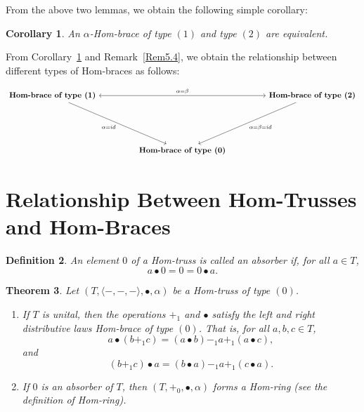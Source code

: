 \documentclass[14pt]{article}
\newtheorem{thm}{Theorem}[section]
\theoremstyle{Definition}
\newtheorem{Def}[thm]{Definition}
\newtheorem{Coro}[thm]{Corollary}
\theoremstyle{remark}
\begin{document}
From the above two lemmas, we obtain the following simple corollary:
\begin{Coro}\label{Coro5.9}
An $\alpha$-Hom-brace of type $(1)$ and type $(2)$ are equivalent.
\end{Coro}

From Corollary~\ref{Coro5.9} and Remark~\ref{Rem5.4}, we obtain the relationship between different types of Hom-braces as follows:  

\[
\begin{tikzcd}
	{\textbf{Hom-brace of type (1)}} 
	\arrow[<->, "{\alpha=\beta}"]{rrrr} 
	&&&& {\textbf{Hom-brace of type (2)}} \\
	\\
	\\
	&& {\textbf{Hom-brace of type (0)}}
	\arrow["{\alpha=id}"', from=1-1, to=4-3]
	\arrow["{\alpha=\beta=id}", from=1-5, to=4-3]
\end{tikzcd}
\]

 
 
 \section{Relationship Between Hom-Trusses and Hom-Braces}
\begin{Def}
An element $0$ of a Hom-truss is called an \emph{absorber} if, for all $a \in T$,
\[
a \bullet 0 = 0 = 0 \bullet a.
\]
\end{Def}

\begin{thm}
Let $(T,\langle-,-,-\rangle,\bullet,\alpha)$ be a Hom-truss of type $(0)$.
\begin{enumerate}
\item[(1)] If $T$ is unital, then the operations $+_{1}$ and $\bullet$ satisfy the left and right distributive laws Hom-brace of type $(0)$. That is, for all $a,b,c \in T$,
\[
a \bullet (b +_{1} c) = (a \bullet b) -_{1} a +_{1} (a \bullet c),
\]
and
\[
(b +_{1} c) \bullet a = (b \bullet a) -_{1} a +_{1} (c \bullet a).
\]
\item[(2)] If $0$ is an absorber of $T$, then $(T,+_{0},\bullet,\alpha)$ forms a Hom-ring (see the definition of Hom-ring).
\end{enumerate}
\end{thm}
\end{document}
